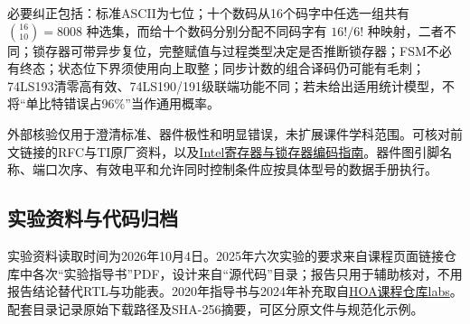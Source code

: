 \documentclass[UTF8,fontset=none,zihao=-4,a4paper]{ctexart}
\begin{document}
必要纠正包括：标准ASCII为七位；十个数码从16个码字中任选一组共有 $\binom{16}{10}=8008$ 种选集，而给十个数码分别分配不同码字有 $16!/6!$ 种映射，二者不同；锁存器可带异步复位，完整赋值与过程类型决定是否推断锁存器；FSM不必有终态；状态位下界须使用向上取整；同步计数的组合译码仍可能有毛刺；74LS193清零高有效、74LS190/191级联端功能不同；若未给出适用统计模型，不将“单比特错误占96\%”当作通用概率。

外部核验仅用于澄清标准、器件极性和明显错误，未扩展课件学科范围。可核对前文链接的RFC与TI原厂资料，以及\href{https://www.intel.com/content/www/us/en/docs/programmable/683082/22-2/register-and-latch-coding-guidelines.html}{Intel寄存器与锁存器编码指南}。器件图引脚名称、端口次序、有效电平和允许同时控制条件应按具体型号的数据手册执行。
\subsection{实验资料与代码归档}
实验资料读取时间为2026年10月4日。2025年六次实验的要求来自课程页面链接仓库中各次“实验指导书”PDF，设计来自“源代码”目录；报告只用于辅助核对，不用报告结论替代RTL与功能表。2020年指导书与2024年补充取自\href{https://github.com/HITSZ-OpenAuto/COMP2051/tree/main/labs}{HOA课程仓库labs}。配套目录记录原始下载路径及SHA-256摘要，可区分原文件与规范化示例。
\end{document}
